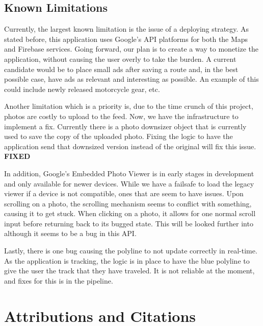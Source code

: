 \documentclass{article}
\begin{document}
                \newpage
                
                \subsection{Known Limitations}

                Currently, the largest known limitation is the issue of a deploying strategy. As stated before, this application uses
                Google's API platforms for both the Maps and Firebase services. Going forward, our plan is to create a way to monetize 
                the application, without causing the user overly to take the burden. A current candidate would be to place small ads
                after saving a route and, in the best possible case, have ads as relevant and interesting as possible. An example of 
                this could include newly released motorcycle gear, etc.

                Another limitation which is a priority is, due to the time crunch of this project, photos are costly to upload to the
                feed. Now, we have the infrastructure to implement a fix. Currently there is a photo downsizer object that is currently 
                used to save the copy of the uploaded photo. Fixing the logic to have the application send that downsized version instead 
                of the original will fix this issue. \textbf{FIXED}

                In addition, Google's Embedded Photo Viewer is in early stages in development and only available for newer devices.
                While we have a failsafe to load the legacy viewer if a device is not compatible, ones that are seem to have issues.
                Upon scrolling on a photo, the scrolling mechanism seems to conflict with something, causing it to get stuck. When
                clicking on a photo, it allows for one normal scroll input before returning back to its bugged state. This will be 
                looked further into although it seems to be a bug in this API.

                Lastly, there is one bug causing the polyline to not update correctly in real-time. As the application is tracking, the 
                logic is in place to have the blue polyline to give the user the track that they have traveled. It is not reliable at
                the moment, and fixes for this is in the pipeline.

            \newpage

            \section{Attributions and Citations}
\end{document}
